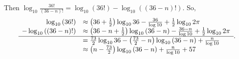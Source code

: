 \documentclass{subfiles}
\begin{document}
\begin{enumerate}
	      Then $\log_{10}{\frac{36!}{(36-n)!}} = \log_{10}{(36!)} - \log_{10}{\left( (36-n)! \right)}$.
	      So,
	      {\renewcommand{\arraystretch}{1.5}
			      \[
				      \begin{array}{r l}
					      \log_{10}{(36!)}        & \approx \left( 36+\frac{1}{2} \right) \log_{10}{36} - \frac{36}{\log{10} }+\frac{1}{2}\log_{10}{2\pi}          \\
					      -  \log_{10}{((36-n)!)} & \approx \left( 36-n+\frac{1}{2} \right)  \log_{10}{(36-n)} - \frac{36-n}{\log{10} }+\frac{1}{2}\log_{10}{2\pi} \\
					      \hline
					                              & = \frac{73}{2}\log_{10}{36}-\left( \frac{73}{2}-n \right) \log_{10}{(36-n)} + \frac{n}{\log{10} }              \\
					                              & \approx \left( n-\frac{73}{2} \right) \log_{10}{(36-n)} + \frac{n}{\log{10} } + 57                             \\
				      \end{array}
				      .\] }
\end{enumerate}
\end{document}
